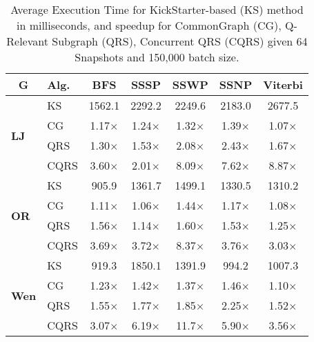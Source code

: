 \begin{table}[!t]
\caption{Average Execution Time for KickStarter-based (KS) method in milliseconds, and speedup for CommonGraph (CG), Q-Relevant Subgraph (QRS), Concurrent QRS (CQRS) given 64 Snapshots and 150,000 batch size.}

\label{tab:time}
\vspace{-0.1in}
\small
\centering
{\renewcommand{\arraystretch}{1.2}
\begin{tabular}{|l|l||c|c|c|c|c|} \hline
\multicolumn{1}{|c|}{\textbf{\textsf{G}}} & \textbf{\textsf{Alg.}} & \textsf{\textbf{BFS}} & \textsf{\textbf{SSSP}} & \textsf{\textbf{SSWP}} & \textsf{\textbf{SSNP}} 
& \textsf{\textbf{Viterbi}} 
\\ \hline \hline

\multirow{4}{*}{\textsf{\textbf{LJ}}} &
    \textsc{KS} & 1562.1 & 2292.2 & 2249.6 & 2183.0 & 2677.5\\ \cline{2-7}
    & \textsc{CG} & 1.17$\times$ & 1.24$\times$ & 1.32$\times$ & 1.39$\times$ & 1.07$\times$\\ \cline{2-7}
    & \textsc{QRS} & 1.30$\times$ & 1.53$\times$ & 2.08$\times$ & 2.43$\times$ & 1.67$\times$\\ \cline{2-7}
    & \textsc{CQRS} & 3.60$\times$ & 2.01$\times$ & 8.09$\times$ & 7.62$\times$ & 8.87$\times$
    \\ \hline \hline
\multirow{4}{*}{\textsf{\textbf{OR}}} &
     \textsc{KS} & 905.9 & 1361.7 & 1499.1 & 1330.5 & 1310.2\\ \cline{2-7}
    & \textsc{CG} & 1.11$\times$ & 1.06$\times$ & 1.44$\times$ & 1.17$\times$ & 1.08$\times$\\ \cline{2-7}
    & \textsc{QRS} & 1.56$\times$ & 1.14$\times$ & 1.60$\times$ & 1.53$\times$ & 1.25$\times$\\ \cline{2-7}
    & \textsc{CQRS} & 3.69$\times$ & 3.72$\times$ & 8.37$\times$ & 3.76$\times$ & 3.03$\times$
    \\ \hline \hline
\multirow{4}{*}{\textsf{\textbf{Wen}}} &
     \textsc{KS} & 919.3 & 1850.1 & 1391.9 & 994.2 & 1007.3\\ \cline{2-7}
    & \textsc{CG} & 1.23$\times$ & 1.42$\times$ & 1.37$\times$ & 1.46$\times$ & 1.10$\times$\\ \cline{2-7}
    & \textsc{QRS} & 1.55$\times$ & 1.77$\times$ & 1.85$\times$ & 2.25$\times$ & 1.52$\times$\\ \cline{2-7}
    & \textsc{CQRS} & 3.07$\times$ & 6.19$\times$ & 11.7$\times$ & 5.90$\times$ & 3.56$\times$
    \\ \hline \hline

\end{tabular}}
\end{table}

